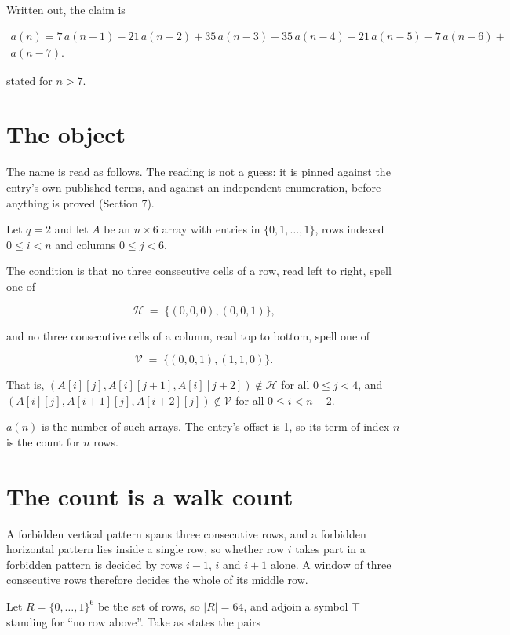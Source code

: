 \documentclass[11pt]{article}
\theoremstyle{definition}
\begin{document}
Written out, the claim is

\begin{multline*} a(n) = 7\,a(n-1) - 21\,a(n-2) + 35\,a(n-3) - 35\,a(n-4) + 21\,a(n-5) - 7\,a(n-6) + \\ a(n-7). \end{multline*}

stated for $n > 7$.

\section{The object}

The name is read as follows. The reading is not a guess: it is pinned against the entry's own published terms, and against an independent enumeration, before anything is proved (Section 7).

Let $q = 2$ and let $A$ be an $n \times 6$ array with entries in $\{0,1,\dots,1\}$, rows indexed $0 \le i < n$ and columns $0 \le j < 6$.

The condition is that no three consecutive cells of a row, read left to right, spell one of

\[\mathcal{H} \;=\; \{(0,0,0), (0,0,1)\},\]

and no three consecutive cells of a column, read top to bottom, spell one of

\[\mathcal{V} \;=\; \{(0,0,1), (1,1,0)\}.\]

That is, $(A[i][j],A[i][j{+}1],A[i][j{+}2]) \notin \mathcal{H}$ for all $0 \le j < 4$, and $(A[i][j],A[i{+}1][j],A[i{+}2][j]) \notin \mathcal{V}$ for all $0 \le i < n-2$.

$a(n)$ is the number of such arrays. The entry's offset is 1, so its term of index $n$ is the count for $n$ rows.

\section{The count is a walk count}

A forbidden vertical pattern spans three consecutive rows, and a forbidden horizontal pattern lies inside a single row, so whether row $i$ takes part in a forbidden pattern is decided by rows $i-1$, $i$ and $i+1$ alone. A window of three consecutive rows therefore decides the whole of its middle row.

Let $R = \{0,\dots,1\}^{6}$ be the set of rows, so $|R| = 64$, and adjoin a symbol $\top$ standing for ``no row above''. Take as states the pairs
\end{document}
